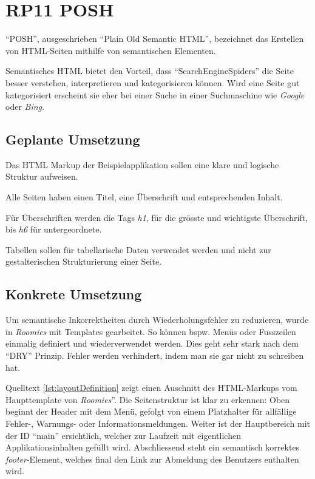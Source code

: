 \section{RP11 POSH}
\label{sec:principle-rp11-posh}

``POSH'', ausgeschrieben ``Plain Old Semantic HTML'', bezeichnet das Erstellen von HTML-Seiten mithilfe von semantischen Elementen. \cite{SemanticHTML}

Semantisches HTML bietet den Vorteil, dass ``\glspl{SearchEngineSpider}'' die Seite besser verstehen, interpretieren und kategorisieren können. Wird eine Seite gut kategorisiert erscheint sie eher bei einer Suche in einer Suchmaschine wie \emph{Google} oder \emph{Bing}.

\subsection*{Geplante Umsetzung}
Das HTML Markup der Beispielapplikation sollen eine klare und logische Struktur aufweisen.

Alle Seiten haben einen Titel, eine Überschrift und entsprechenden Inhalt.

Für Überschriften werden die Tags \emph{h1}, für die grösste und wichtigste Überschrift, bis \emph{h6} für untergeordnete.

Tabellen sollen für tabellarische Daten verwendet werden und nicht zur gestalterischen Strukturierung einer Seite.


\subsection*{Konkrete Umsetzung}
Um semantische Inkorrektheiten durch Wiederholungsfehler zu reduzieren, wurde in \emph{Roomies} mit Templates gearbeitet. So können bspw. Menüs oder Fusszeilen einmalig definiert und wiederverwendet werden. Dies geht sehr stark nach dem ``\gls{DRY}'' Prinzip. Fehler werden verhindert, indem man sie gar nicht zu schreiben hat.

Quelltext \ref{lst:layoutDefinition} zeigt einen Auschnitt des HTML-Markups vom Haupttemplate von \emph{Roomies}''. Die Seitenstruktur ist klar zu erkennen: Oben beginnt der Header mit dem Menü, gefolgt von einem Platzhalter für allfällige Fehler-, Warnungs- oder Informationsmeldungen. Weiter ist der Hauptbereich mit der ID ``main'' ersichtlich, welcher zur Laufzeit mit eigentlichen Applikationsinhalten gefüllt wird. Abschliessend steht ein semantisch korrektes \emph{footer}-Element, welches final den Link zur Abmeldung des Benutzers enthalten wird.

